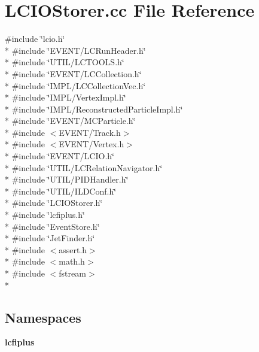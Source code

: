 \section{L\-C\-I\-O\-Storer.\-cc File Reference}
\label{LCIOStorer_8cc}
{\ttfamily \#include \char`\"{}lcio.\-h\char`\"{}}\\*
{\ttfamily \#include \char`\"{}E\-V\-E\-N\-T/\-L\-C\-Run\-Header.\-h\char`\"{}}\\*
{\ttfamily \#include \char`\"{}U\-T\-I\-L/\-L\-C\-T\-O\-O\-L\-S.\-h\char`\"{}}\\*
{\ttfamily \#include \char`\"{}E\-V\-E\-N\-T/\-L\-C\-Collection.\-h\char`\"{}}\\*
{\ttfamily \#include \char`\"{}I\-M\-P\-L/\-L\-C\-Collection\-Vec.\-h\char`\"{}}\\*
{\ttfamily \#include \char`\"{}I\-M\-P\-L/\-Vertex\-Impl.\-h\char`\"{}}\\*
{\ttfamily \#include \char`\"{}I\-M\-P\-L/\-Reconstructed\-Particle\-Impl.\-h\char`\"{}}\\*
{\ttfamily \#include \char`\"{}E\-V\-E\-N\-T/\-M\-C\-Particle.\-h\char`\"{}}\\*
{\ttfamily \#include $<$E\-V\-E\-N\-T/\-Track.\-h$>$}\\*
{\ttfamily \#include $<$E\-V\-E\-N\-T/\-Vertex.\-h$>$}\\*
{\ttfamily \#include \char`\"{}E\-V\-E\-N\-T/\-L\-C\-I\-O.\-h\char`\"{}}\\*
{\ttfamily \#include \char`\"{}U\-T\-I\-L/\-L\-C\-Relation\-Navigator.\-h\char`\"{}}\\*
{\ttfamily \#include \char`\"{}U\-T\-I\-L/\-P\-I\-D\-Handler.\-h\char`\"{}}\\*
{\ttfamily \#include \char`\"{}U\-T\-I\-L/\-I\-L\-D\-Conf.\-h\char`\"{}}\\*
{\ttfamily \#include \char`\"{}L\-C\-I\-O\-Storer.\-h\char`\"{}}\\*
{\ttfamily \#include \char`\"{}lcfiplus.\-h\char`\"{}}\\*
{\ttfamily \#include \char`\"{}Event\-Store.\-h\char`\"{}}\\*
{\ttfamily \#include \char`\"{}Jet\-Finder.\-h\char`\"{}}\\*
{\ttfamily \#include $<$assert.\-h$>$}\\*
{\ttfamily \#include $<$math.\-h$>$}\\*
{\ttfamily \#include $<$fstream$>$}\\*
\subsection*{Namespaces}
\begin{DoxyCompactItemize}
\item 
{\bf lcfiplus}
\end{DoxyCompactItemize}
